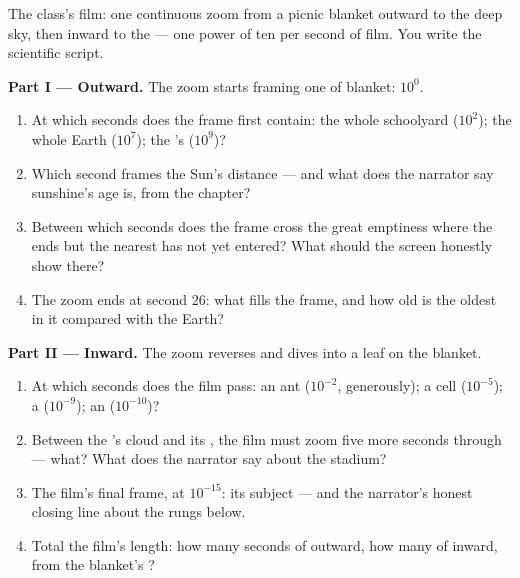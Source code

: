 \begin{problem}\label{pb:g9:atoms-to-galaxies:1}
The class's film: one continuous zoom from a picnic blanket
outward to the deep sky, then inward to the  ---
one power of ten per second of film. You write the
scientific script.

\medskip\noindent\textbf{Part I --- Outward.}
The zoom starts framing one  of blanket: $10^{0}$.
\begin{enumerate}
  \item At which seconds does the frame first contain: the
        whole schoolyard ($10^{2}$); the whole Earth
        ($10^{7}$); the 's  ($10^{9}$)?
  \item Which second frames the Sun's distance --- and what
        does the narrator say sunshine's age is, from the
         chapter?
  \item Between which seconds does the frame cross the
        great emptiness where the  ends but the
        nearest  has not yet entered? What should the
        screen honestly show there?
  \item The zoom ends at second $26$: what fills the frame,
        and how old is the oldest  in it compared with
        the Earth?
\end{enumerate}

\medskip\noindent\textbf{Part II --- Inward.}
The zoom reverses and dives into a leaf on the blanket.
\begin{enumerate}[resume]
  \item At which seconds does the film pass: an ant
        ($10^{-2}$, generously); a cell ($10^{-5}$); a
         ($10^{-9}$); an  ($10^{-10}$)?
  \item Between the 's  cloud and its ,
        the film must zoom five more seconds through ---
        what? What does the narrator say about the
        stadium?
  \item The film's final frame, at $10^{-15}$: its subject
        --- and the narrator's honest closing line about
        the rungs below.
  \item Total the film's length: how many seconds of
        outward, how many of inward, from the blanket's
        ?
\end{enumerate}


\end{problem}
